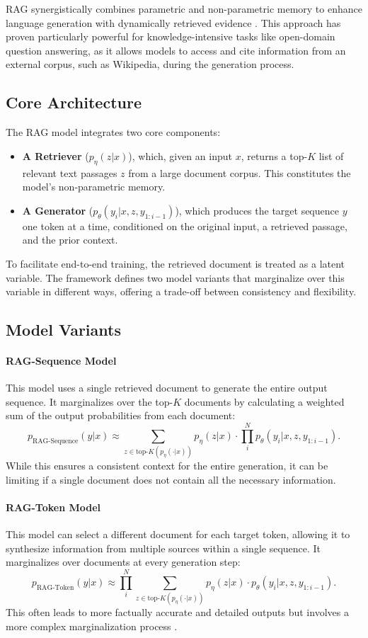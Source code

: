 \documentclass[a4paper,12pt]{article}
\begin{document}
RAG synergistically combines parametric and non-parametric memory to enhance language generation with dynamically retrieved evidence \cite{lewis2020rag}. This approach has proven particularly powerful for knowledge-intensive tasks like open-domain question answering, as it allows models to access and cite information from an external corpus, such as Wikipedia, during the generation process.

\subsection{Core Architecture}
The RAG model integrates two core components:
\begin{itemize}
    \item \textbf{A Retriever} ($p_{\eta}(z|x)$), which, given an input $x$, returns a top-$K$ list of relevant text passages $z$ from a large document corpus. This constitutes the model's non-parametric memory.
    \item \textbf{A Generator} ($p_{\theta}(y_i|x, z, y_{1:i-1})$), which produces the target sequence $y$ one token at a time, conditioned on the original input, a retrieved passage, and the prior context.
\end{itemize}
To facilitate end-to-end training, the retrieved document is treated as a latent variable. The framework defines two model variants that marginalize over this variable in different ways, offering a trade-off between consistency and flexibility.

\subsection{Model Variants}
\paragraph{RAG-Sequence Model}
This model uses a single retrieved document to generate the entire output sequence. It marginalizes over the top-$K$ documents by calculating a weighted sum of the output probabilities from each document:
\[
p_{\text{RAG-Sequence}}(y|x) \approx \sum_{z \in \text{top-}K(p_{\eta}(\cdot|x))} p_{\eta}(z|x) \cdot \prod_{i}^{N} p_{\theta}(y_i|x, z, y_{1:i-1}).
\]
While this ensures a consistent context for the entire generation, it can be limiting if a single document does not contain all the necessary information.

\paragraph{RAG-Token Model}
This model can select a different document for each target token, allowing it to synthesize information from multiple sources within a single sequence. It marginalizes over documents at every generation step:
\[
p_{\text{RAG-Token}}(y|x) \approx \prod_{i}^{N} \sum_{z \in \text{top-}K(p_{\eta}(\cdot|x))} p_{\eta}(z|x) \cdot p_{\theta}(y_i|x, z, y_{1:i-1}).
\]
This often leads to more factually accurate and detailed outputs but involves a more complex marginalization process \cite{lewis2020rag}.
\end{document}
